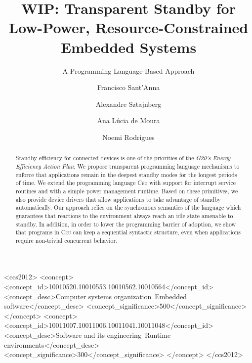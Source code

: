 \documentclass[sigplan]{acmart}
\newcommand{\CEU}{\textsc{C\'{e}u}\xspace}
\begin{document}
\title{WIP: Transparent Standby for Low-Power, Resource-Constrained Embedded Systems}
\subtitle{A Programming Language-Based Approach}


\author[F.~Sant'Anna]{Francisco Sant'Anna}
%
\author[A.~Sztajnberg]{Alexandre Sztajnberg}
%
\author[A.L..~de~Moura]{Ana L\'ucia de Moura}
%
\author[N.~Rodrigues]{Noemi Rodrigues}


\begin{abstract}
Standby efficiency for connected devices is one of the priorities of the
\emph{G20's Energy Efficiency Action Plan}.
%
We propose transparent programming language mechanisms to enforce that
applications remain in the deepest standby modes for the longest periods of
time.
%
We extend the programming language \CEU with support for interrupt service
routines and with a simple power management runtime.
%
Based on these primitives, we also provide device drivers that allow
applications to take advantage of standby automatically.
%
Our approach relies on the synchronous semantics of the language which
guarantees that reactions to the environment always reach an idle state
amenable to standby.
%
In addition, in order to lower the programming barrier of adoption, we show
that programs in \CEU can keep a sequential syntactic structure, even when
applications require non-trivial concurrent behavior.
\end{abstract}

%
%
\begin{CCSXML}
<ccs2012>
    <concept>
        <concept_id>10010520.10010553.10010562.10010564</concept_id>
        <concept_desc>Computer systems organization~Embedded software</concept_desc>
    <concept_significance>500</concept_significance>
    </concept>
    <concept>
        <concept_id>10011007.10011006.10011041.10011048</concept_id>
        <concept_desc>Software and its engineering~Runtime environments</concept_desc>
        <concept_significance>300</concept_significance>
    </concept>
</ccs2012>
\end{CCSXML}
\end{document}
